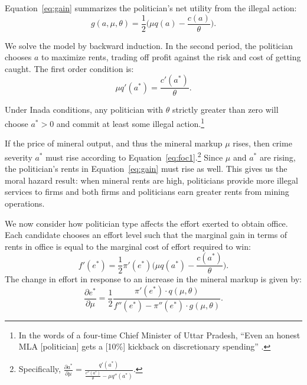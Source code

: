 Equation~\ref{eq:gain} summarizes the politician's net utility from
the illegal action:
%
\begin{equation}
\label{eq:gain}
g(a,\mu,\theta) = \frac{1}{2} \big(\mu q(a) - \frac{c(a)}{\theta}\big)\text{.}
\end{equation}

\noindent We solve the model by backward induction. In the second
period, the politician
chooses $a$ to maximize rents, trading off profit against the risk and
cost of
getting caught. The first order condition is:
%
\begin{equation}
\label{eq:foc1}
\mu q'(a^*)=\frac{c'(a^*)}{\theta}\text{.}
\end{equation}

\noindent Under Inada conditions, any politician with $\theta$ strictly greater
than zero will choose $a^* > 0$ and commit at least some illegal
action.\footnote{In the words of a four-time Chief Minister of Uttar
  Pradesh, ``Even an honest MLA [politician] gets a [10\%] kickback on
  discretionary spending'' \cite{Vaishnav2017}.}

If the price of mineral output, and thus the mineral markup $\mu$
rises, then crime severity $a^*$ must rise according to
Equation~\ref{eq:foc1}.\footnote{Specifically,
  $\frac{\partial{a^*}}{\partial{\mu}} =
  \frac{q'(a^*)}{\frac{c''(a^*)}{\theta}-\mu q''(a^*)}$.}
Since $\mu$ and $a^*$ are rising, the
politician's rents in Equation~\ref{eq:gain} must rise as
well.  This gives us the moral hazard result: when mineral rents are
high, politicians provide more illegal services to firms and both
firms and politicians earn greater rents from mining operations.

We now consider how politician type affects the effort exerted to
obtain office. Each candidate chooses an effort level such that the
marginal gain in terms of rents in office is equal to the marginal
cost of effort required to win:
%
\begin{equation}
f'(e^*) = \frac{1}{2} \pi'(e^*) \big( \mu q(a^*) - \frac{c(a^*)}{\theta}\big)\text{.}
\end{equation}
%
The change in effort in response to an increase in the mineral markup
is given by:
%
\begin{equation}
\frac{\partial e^*}{\partial \mu} = \frac{1}{2} \frac{\pi'(e^*)\cdot
  q(\mu,\theta)}{f''(e^*)-\pi''(e^*)\cdot g(\mu,\theta)}\text{.}
\end{equation}

